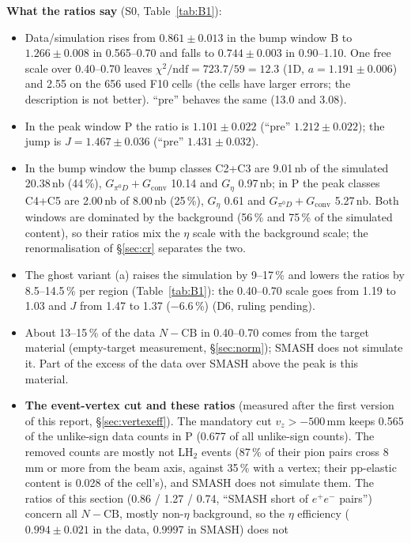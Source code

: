 \documentclass[11pt,a4paper]{article}
\newcommand{\ee}{\ensuremath{e^{+}e^{-}}\xspace}
\newcommand{\vz}{\ensuremath{v_z}\xspace}
\newcommand{\Geta}{\ensuremath{G_\eta}\xspace}
\begin{document}
\textbf{What the ratios say} (S0, Table~\ref{tab:B1}):
\begin{itemize}\setlength{\itemsep}{0pt}
\item Data/simulation rises from $0.861\pm0.013$ in the bump window B to $1.266\pm0.008$ in 0.565--0.70 and falls to $0.744\pm0.003$ in
      0.90--1.10. One free scale over 0.40--0.70 leaves $\chi^2/\mathrm{ndf}=723.7/59=12.3$ (1D, $a=1.191\pm0.006$) and 2.55 on the 656 used
      F10 cells (the cells have larger errors; the description is not better). ``pre'' behaves the same (13.0 and 3.08).
\item In the peak window P the ratio is $1.101\pm0.022$ (``pre'' $1.212\pm0.022$); the jump is $J=1.467\pm0.036$ (``pre'' $1.431\pm0.032$).
\item In the bump window the bump classes C2+C3 are 9.01\,nb of the simulated 20.38\,nb (44\,\%), $G_{\pi^0D}+G_{\mathrm{conv}}$ 10.14 and
      \Geta 0.97\,nb; in P the peak classes C4+C5 are 2.00\,nb of 8.00\,nb (25\,\%), \Geta 0.61 and $G_{\pi^0D}+G_{\mathrm{conv}}$ 5.27\,nb.
      Both windows are dominated by the background (56\,\% and 75\,\% of the simulated content), so their ratios mix the $\eta$ scale with
      the background scale; the renormalisation of \S\ref{sec:cr} separates the two.
\item The ghost variant (a) raises the simulation by 9--17\,\% and lowers the ratios by 8.5--14.5\,\% per region (Table~\ref{tab:B1}):
      the 0.40--0.70 scale goes from 1.19 to 1.03 and $J$ from 1.47 to 1.37 ($-6.6$\,\%) (D6, ruling pending).
\item About 13--15\,\% of the data $N-\mathrm{CB}$ in 0.40--0.70 comes from the target material (empty-target measurement,
      \S\ref{sec:norm}); SMASH does not simulate it. Part of the excess of the data over SMASH above the peak is this material.
\item \textbf{The event-vertex cut and these ratios} (measured after the first version of this report, \S\ref{sec:vertexeff}). The
      mandatory cut $\vz>-500$\,mm keeps 0.565 of the unlike-sign data counts in P (0.677 of all unlike-sign counts). The removed counts are mostly
      not LH$_2$ events (87\,\% of their pion pairs cross 8\,mm or more from the beam axis, against 35\,\% with a vertex; their pp-elastic content
      is 0.028 of the cell's), and SMASH does not simulate them. The ratios of this section (0.86 / 1.27 / 0.74, ``SMASH short of \ee pairs'')
      concern all $N-\mathrm{CB}$, mostly non-$\eta$ background, so the $\eta$ efficiency ($0.994\pm0.021$ in the data, 0.9997 in SMASH) does not

\end{itemize}
\end{document}
